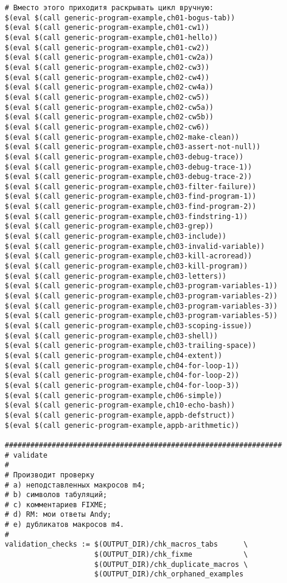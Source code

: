 {\begin{verbatim}
# Вместо этого приходитя раскрывать цикл вручную:
$(eval $(call generic-program-example,ch01-bogus-tab))
$(eval $(call generic-program-example,ch01-cw1))
$(eval $(call generic-program-example,ch01-hello))
$(eval $(call generic-program-example,ch01-cw2))
$(eval $(call generic-program-example,ch01-cw2a))
$(eval $(call generic-program-example,ch02-cw3))
$(eval $(call generic-program-example,ch02-cw4))
$(eval $(call generic-program-example,ch02-cw4a))
$(eval $(call generic-program-example,ch02-cw5))
$(eval $(call generic-program-example,ch02-cw5a))
$(eval $(call generic-program-example,ch02-cw5b))
$(eval $(call generic-program-example,ch02-cw6))
$(eval $(call generic-program-example,ch02-make-clean))
$(eval $(call generic-program-example,ch03-assert-not-null))
$(eval $(call generic-program-example,ch03-debug-trace))
$(eval $(call generic-program-example,ch03-debug-trace-1))
$(eval $(call generic-program-example,ch03-debug-trace-2))
$(eval $(call generic-program-example,ch03-filter-failure))
$(eval $(call generic-program-example,ch03-find-program-1))
$(eval $(call generic-program-example,ch03-find-program-2))
$(eval $(call generic-program-example,ch03-findstring-1))
$(eval $(call generic-program-example,ch03-grep))
$(eval $(call generic-program-example,ch03-include))
$(eval $(call generic-program-example,ch03-invalid-variable))
$(eval $(call generic-program-example,ch03-kill-acroread))
$(eval $(call generic-program-example,ch03-kill-program))
$(eval $(call generic-program-example,ch03-letters))
$(eval $(call generic-program-example,ch03-program-variables-1))
$(eval $(call generic-program-example,ch03-program-variables-2))
$(eval $(call generic-program-example,ch03-program-variables-3))
$(eval $(call generic-program-example,ch03-program-variables-5))
$(eval $(call generic-program-example,ch03-scoping-issue))
$(eval $(call generic-program-example,ch03-shell))
$(eval $(call generic-program-example,ch03-trailing-space))
$(eval $(call generic-program-example,ch04-extent))
$(eval $(call generic-program-example,ch04-for-loop-1))
$(eval $(call generic-program-example,ch04-for-loop-2))
$(eval $(call generic-program-example,ch04-for-loop-3))
$(eval $(call generic-program-example,ch06-simple))
$(eval $(call generic-program-example,ch10-echo-bash))
$(eval $(call generic-program-example,appb-defstruct))
$(eval $(call generic-program-example,appb-arithmetic))

#################################################################
# validate
#
# Производит проверку
# a) неподставленных макросов m4;
# b) символов табуляций;
# c) комментариев FIXME;
# d) RM: мои ответы Andy;
# e) дубликатов макросов m4.
#
validation_checks := $(OUTPUT_DIR)/chk_macros_tabs      \
                     $(OUTPUT_DIR)/chk_fixme            \
                     $(OUTPUT_DIR)/chk_duplicate_macros \
                     $(OUTPUT_DIR)/chk_orphaned_examples


\end{verbatim}}
